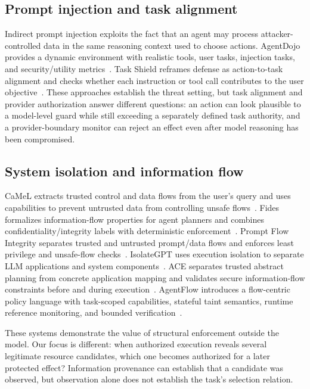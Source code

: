 \documentclass[5p,times,twocolumn]{elsarticle}
\begin{document}
\subsection{Prompt injection and task alignment}

Indirect prompt injection exploits the fact that an agent may process attacker-controlled data in the same reasoning context used to choose actions. AgentDojo provides a dynamic environment with realistic tools, user tasks, injection tasks, and security/utility metrics~\cite{debenedetti2024agentdojo}. Task Shield reframes defense as action-to-task alignment and checks whether each instruction or tool call contributes to the user objective~\cite{jia2025taskshield}. These approaches establish the threat setting, but task alignment and provider authorization answer different questions: an action can look plausible to a model-level guard while still exceeding a separately defined task authority, and a provider-boundary monitor can reject an effect even after model reasoning has been compromised.

\subsection{System isolation and information flow}

CaMeL extracts trusted control and data flows from the user's query and uses capabilities to prevent untrusted data from controlling unsafe flows~\cite{debenedetti2025camel}. Fides formalizes information-flow properties for agent planners and combines confidentiality/integrity labels with deterministic enforcement~\cite{costa2025fides}. Prompt Flow Integrity separates trusted and untrusted prompt/data flows and enforces least privilege and unsafe-flow checks~\cite{kim2025pfi}. IsolateGPT uses execution isolation to separate LLM applications and system components~\cite{wu2025isolategpt}. ACE separates trusted abstract planning from concrete application mapping and validates secure information-flow constraints before and during execution~\cite{li2026ace}. AgentFlow introduces a flow-centric policy language with task-scoped capabilities, stateful taint semantics, runtime reference monitoring, and bounded verification~\cite{shivakumar2026agentflow}.

These systems demonstrate the value of structural enforcement outside the model. Our focus is different: when authorized execution reveals several legitimate resource candidates, which one becomes authorized for a later protected effect? Information provenance can establish that a candidate was observed, but observation alone does not establish the task's selection relation.
\end{document}
